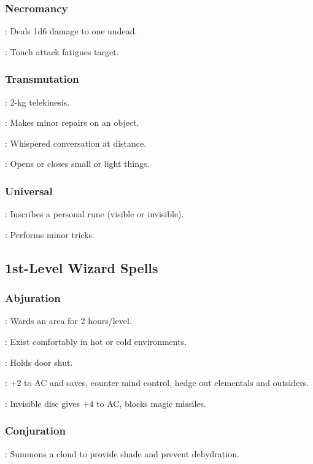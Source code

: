 \subsubsection{Necromancy}
	: Deals 1d6 damage to one undead.

	: Touch attack fatigues target.

\subsubsection{Transmutation}
	: 2-kg telekinesis.

	: Makes minor repairs on an object.

	: Whispered conversation at distance.

	: Opens or closes small or light things.

\subsubsection{Universal}
	: Inscribes a personal rune (visible or invisible).

	: Performs minor tricks.



\subsection{1st-Level Wizard Spells}

\subsubsection{Abjuration}
	: Wards an area for 2 hours/level.

	: Exist comfortably in hot or cold environments.

	: Holds door shut.

	: +2 to AC and saves, counter mind control, hedge out elementals and outsiders.

	: Invisible disc gives +4 to AC, blocks magic missiles.

\subsubsection{Conjuration}
	: Summons a cloud to provide shade and prevent dehydration. %

